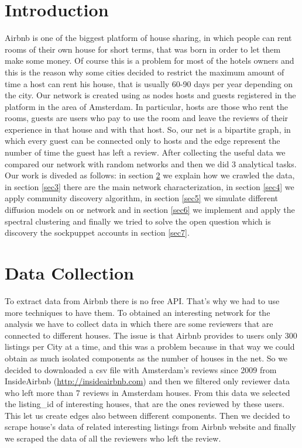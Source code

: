 \documentclass[sigchi]{acmart}
\begin{document}
%
\maketitle

\section{Introduction}
Airbnb is one of the biggest platform of house sharing, in which people can rent rooms of their own house for short terms, that was born in order to let them make some money. Of course this is a problem for most of the hotels owners and this is the reason why some cities decided to restrict the maximum amount of time a host can rent his house, that is usually 60-90 days per year depending on the city. 
Our network is created using as nodes hosts and guests registered in the platform in the area of Amsterdam. In particular, hosts are those who rent the rooms, guests are users who pay to use the room and leave the reviews of their experience in that house and with that host. So, our net is a bipartite graph, in which every guest can be connected only to hosts and the edge represent the number of time the guest has left a review.  \newline
After collecting the useful data we compared our network with random networks and then we did 3 analytical tasks.\newline
Our work is diveded as follows: in section \ref{sec2} we explain how we crawled the data, in section \ref{sec3} there are the main network characterization, in section \ref{sec4} we apply community discovery algorithm, in section \ref{sec5} we simulate different diffusion models on or network and in section \ref{sec6} we implement and apply the spectral clustering and finally we tried to solve the open question which is discovery the sockpuppet accounts in section \ref{sec7}.


\section{Data Collection} \label{sec2}

To extract data from Airbnb there is no free API. That's why we had to use more techniques to have them. 
To obtained an interesting network for the analysis we have to collect data in which there are some reviewers that are connected to different houses. The issue is that Airbnb provides to users only 300 listings per City at a time, and this was a problem because in that way we could obtain as much isolated components as the number of houses in the net. So we decided to downloaded a csv file with Amsterdam's reviews since 2009 from InsideAirbnb (\url{http://insideairbnb.com}) and then we filtered only reviewer data who left more than 7 reviews in Amsterdam houses.  From this data we selected the listing\_id of interesting houses, that are the ones reviewed by these users. This let us create edges also between different components. Then we decided to scrape house's data of related interesting listings from Airbnb website and finally we scraped the data of all the reviewers who left the review.
\end{document}
